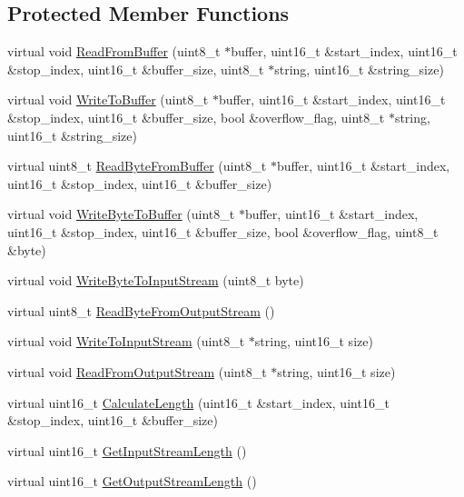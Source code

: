 \subsection*{Protected Member Functions}
\begin{DoxyCompactItemize}
\item 
virtual void \hyperlink{class_stream_add5927208d603b08341f8972652d9c44}{Read\-From\-Buffer} (uint8\-\_\-t $\ast$buffer, uint16\-\_\-t \&start\-\_\-index, uint16\-\_\-t \&stop\-\_\-index, uint16\-\_\-t \&buffer\-\_\-size, uint8\-\_\-t $\ast$string, uint16\-\_\-t \&string\-\_\-size)
\item 
virtual void \hyperlink{class_stream_a456d59b1944143a8e4a977b8861d42ea}{Write\-To\-Buffer} (uint8\-\_\-t $\ast$buffer, uint16\-\_\-t \&start\-\_\-index, uint16\-\_\-t \&stop\-\_\-index, uint16\-\_\-t \&buffer\-\_\-size, bool \&overflow\-\_\-flag, uint8\-\_\-t $\ast$string, uint16\-\_\-t \&string\-\_\-size)
\item 
virtual uint8\-\_\-t \hyperlink{class_stream_a6c49bb8565d238e13c3ca3e9eddcf38e}{Read\-Byte\-From\-Buffer} (uint8\-\_\-t $\ast$buffer, uint16\-\_\-t \&start\-\_\-index, uint16\-\_\-t \&stop\-\_\-index, uint16\-\_\-t \&buffer\-\_\-size)
\item 
virtual void \hyperlink{class_stream_a129f3c3e763ceab692bdde38fdc89402}{Write\-Byte\-To\-Buffer} (uint8\-\_\-t $\ast$buffer, uint16\-\_\-t \&start\-\_\-index, uint16\-\_\-t \&stop\-\_\-index, uint16\-\_\-t \&buffer\-\_\-size, bool \&overflow\-\_\-flag, uint8\-\_\-t \&byte)
\item 
virtual void \hyperlink{class_stream_a70108ab0e811c6cab2636bf7afeb5e14}{Write\-Byte\-To\-Input\-Stream} (uint8\-\_\-t byte)
\item 
virtual uint8\-\_\-t \hyperlink{class_stream_a712a8e0c6659799b1bb2999b53bd983d}{Read\-Byte\-From\-Output\-Stream} ()
\item 
virtual void \hyperlink{class_stream_aa2f020721d273ce821ccf626e5eb773c}{Write\-To\-Input\-Stream} (uint8\-\_\-t $\ast$string, uint16\-\_\-t size)
\item 
virtual void \hyperlink{class_stream_adce437b86a098710237ac7dcccd5508d}{Read\-From\-Output\-Stream} (uint8\-\_\-t $\ast$string, uint16\-\_\-t size)
\item 
virtual uint16\-\_\-t \hyperlink{class_stream_a8abdeaae6339d9873842a951843cb386}{Calculate\-Length} (uint16\-\_\-t \&start\-\_\-index, uint16\-\_\-t \&stop\-\_\-index, uint16\-\_\-t \&buffer\-\_\-size)
\item 
virtual uint16\-\_\-t \hyperlink{class_stream_ac9d4705ce8fe5c9ac473939fcac423f6}{Get\-Input\-Stream\-Length} ()
\item 
virtual uint16\-\_\-t \hyperlink{class_stream_a6378bb812d0b77890926d1c724140146}{Get\-Output\-Stream\-Length} ()
\end{DoxyCompactItemize}
